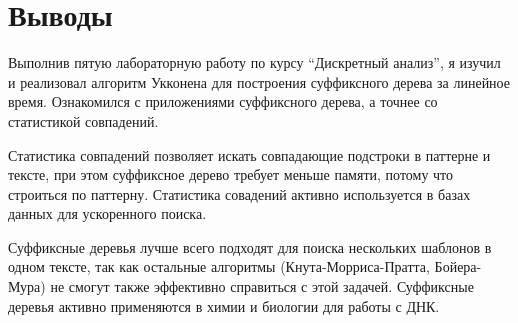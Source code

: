 \section{Выводы}

Выполнив пятую лабораторную работу по курсу \enquote{Дискретный анализ}, 
я изучил и реализовал алгоритм Укконена для построения суффиксного дерева за линейное время. 
Ознакомился с приложениями суффиксного дерева, а точнее со статистикой совпадений.

Статистика совпадений позволяет искать совпадающие подстроки в паттерне и тексте, 
при этом суффиксное дерево требует меньше памяти, потому что строиться по паттерну. 
Статистика совадений активно используется в базах данных для ускоренного поиска.

Суффиксные деревья лучше всего подходят для поиска нескольких шаблонов в одном тексте, 
так как остальные алгоритмы (Кнута-Морриса-Пратта, Бойера-Мура) не смогут также эффективно справиться с этой задачей.
Суффиксные деревья активно применяются в химии и биологии для работы с ДНК.
\pagebreak